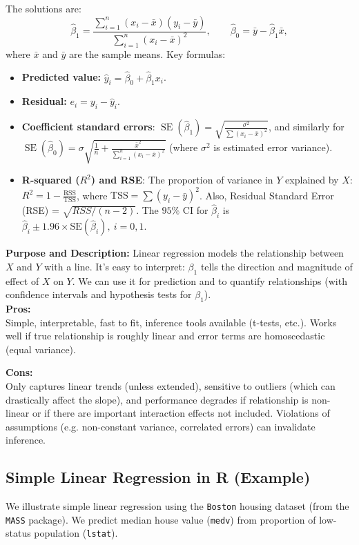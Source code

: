 \documentclass[11pt]{article}
\begin{document}
The solutions are:
\[ \hat\beta_1 = \frac{\sum_{i=1}^n (x_i - \bar{x})(y_i - \bar{y})}{\sum_{i=1}^n (x_i - \bar{x})^2}, \qquad 
\hat\beta_0 = \bar{y} - \hat\beta_1 \bar{x}, \] 
where $\bar{x}$ and $\bar{y}$ are the sample means. Key formulas:
\begin{itemize}
  \item \textbf{Predicted value:} $\hat{y}_i = \hat\beta_0 + \hat\beta_1 x_i$.
  \item \textbf{Residual:} $e_i = y_i - \hat{y}_i$.
  \item \textbf{Coefficient standard errors}: 
  $\operatorname{SE}(\hat\beta_1) = \sqrt{\frac{\sigma^2}{\sum (x_i-\bar{x})^2}}$, 
  and similarly for $\operatorname{SE}(\hat\beta_0) = \sigma \sqrt{\frac{1}{n}+\frac{\bar{x}^2}{\sum_{i=1}^{n}{(x_i - \bar{x})^2}}}$ (where $\sigma^2$ is estimated error variance).
  \item \textbf{R-squared ($R^2$) and RSE}: The proportion of variance in $Y$ explained by $X$: 
  $R^2 = 1 - \frac{\text{RSS}}{\text{TSS}}$, where $\text{TSS} = \sum (y_i-\bar{y})^2$. Also, Residual Standard Error (RSE) = $\sqrt{RSS/(n-2)}$. The $95\%$ CI for $\hat\beta_i$ is $\hat\beta_i \pm 1.96 \times \text{SE}(\hat\beta_i), \: i=0,1$.
\end{itemize} \phantom{i}

\noindent \textbf{Purpose and Description:} Linear regression models the relationship between $X$ and $Y$ with a line. It's easy to interpret: $\beta_1$ tells the direction and magnitude of effect of $X$ on $Y$. We can use it for prediction and to quantify relationships (with confidence intervals and hypothesis tests for $\beta_1$). \\

\noindent \textbf{Pros:} \\
\noindent Simple, interpretable, fast to fit, inference tools available (t-tests, etc.). Works well if true relationship is roughly linear and error terms are homoscedastic (equal variance).

\noindent \textbf{Cons:} \\
\noindent Only captures linear trends (unless extended), sensitive to outliers (which can drastically affect the slope), and performance degrades if relationship is non-linear or if there are important interaction effects not included. Violations of assumptions (e.g. non-constant variance, correlated errors) can invalidate inference.

\subsection{Simple Linear Regression in R (Example)}
We illustrate simple linear regression using the \texttt{Boston} housing dataset (from the \texttt{MASS} package). We predict median house value (\texttt{medv}) from proportion of low-status population (\texttt{lstat}). 
\end{document}
